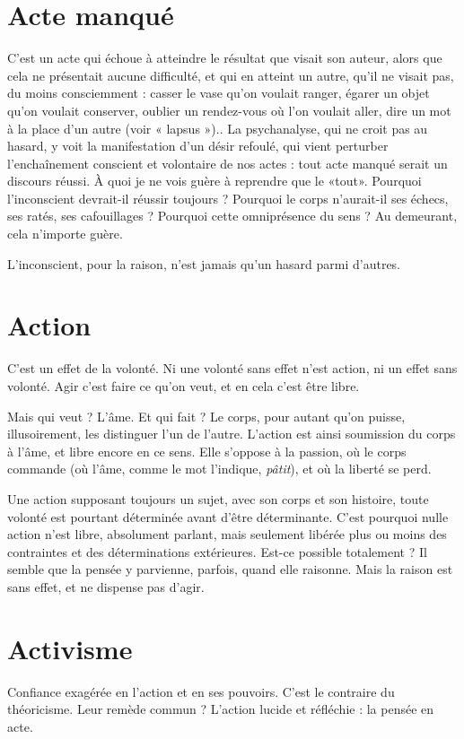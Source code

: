 \section{Acte manqué}
C’est un acte qui échoue à atteindre le résultat que visait
son auteur, alors que cela ne présentait aucune difficulté,
et qui en atteint un autre, qu'il ne visait pas, du moins consciemment : casser
le vase qu’on voulait ranger, égarer un objet qu’on voulait conserver, oublier un
rendez-vous où l’on voulait aller, dire un mot à la place d’un autre (voir
« lapsus »).. La psychanalyse, qui ne croit pas au hasard, y voit la manifestation
d’un désir refoulé, qui vient perturber l’enchaînement conscient et volontaire
de nos actes : tout acte manqué serait un discours réussi. À quoi je ne vois
guère à reprendre que le «tout». Pourquoi l'inconscient devrait-il réussir
toujours ? Pourquoi le corps n’aurait-il ses échecs, ses ratés, ses cafouillages ?
Pourquoi cette omniprésence du sens ? Au demeurant, cela n'importe guère.

L’inconscient, pour la raison, n’est jamais qu’un hasard parmi d’autres.

\section{Action}
C’est un effet de la volonté. Ni une volonté sans effet n’est action, ni
un effet sans volonté. Agir c’est faire ce qu’on veut, et en cela c’est
être libre.

Mais qui veut ? L'âme. Et qui fait ? Le corps, pour autant qu’on puisse,
illusoirement, les distinguer l’un de l’autre. L’action est ainsi soumission du
corps à l’âme, et libre encore en ce sens. Elle s'oppose à la passion, où le
corps commande (où l’âme, comme le mot l’indique, {\it pâtit}), et où la liberté
se perd.

Une action supposant toujours un sujet, avec son corps et son histoire,
toute volonté est pourtant déterminée avant d’être déterminante. C’est pourquoi
nulle action n’est libre, absolument parlant, mais seulement libérée plus
ou moins des contraintes et des déterminations extérieures. Est-ce possible
totalement ? Il semble que la pensée y parvienne, parfois, quand elle raisonne.
Mais la raison est sans effet, et ne dispense pas d’agir.

\section{Activisme}
Confiance exagérée en l’action et en ses pouvoirs. C’est le contraire
du théoricisme. Leur remède commun ? L'action lucide et
réfléchie : la pensée en acte.

